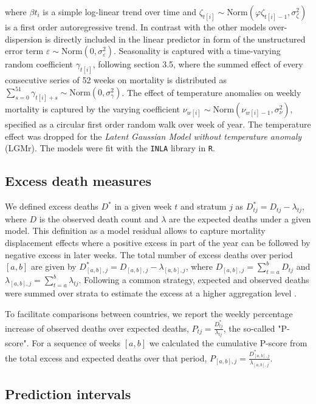 \documentclass[12pt]{article}
\begin{document}
where $\beta t_i$ is a simple log-linear trend over time and $\zeta_{t[i]} \sim \text{Norm}(\varphi \zeta_{t[i]-1}, \sigma^2_\zeta)$ is a first order autoregressive trend. In contrast with the other models over-dispersion is directly included in the linear predictor in form of the unstructured error term $\varepsilon \sim \text{Norm}(0, \sigma^2_\varepsilon)$. Seasonality is captured with a time-varying random coefficient $\gamma_{t[i]}$, following \cite{Rue2005} section 3.5, where the summed effect of every consecutive series of 52 weeks on mortality is distributed as $\sum_{s=0}^{51} \gamma_{t[i]+s} \sim \text{Norm}(0, \sigma^2_\gamma)$. The effect of temperature anomalies on weekly mortality is captured by the varying coefficient $\nu_{w[i]} \sim \text{Norm}(\nu_{w[i]-1}, \sigma^2_\nu)$, specified as a circular first order random walk over week of year. The temperature effect was dropped for the \emph{Latent Gaussian Model without temperature anomaly} (LGMr). The models were fit with the \texttt{INLA} library \cite{Rue2009, Rue2021} in \texttt{R}.

\subsection*{Excess death measures}

We defined excess deaths $D^*$ in a given week $t$ and stratum $j$ as
$D_{tj}^* = D_{tj}-\lambda_{tj}$,
where $D$ is the observed death count and $\lambda$ are the expected deaths under a given model. This definition as a model residual allows to capture mortality displacement effects where a positive excess in part of the year can be followed by negative excess in later weeks. The total number of excess deaths over period $[a,b]$ are given by
$D_{[a,b], j}^* = D_{[a,b], j} - \lambda_{[a,b], j}$,
where
$D_{[a,b], j}=\sum_{t=a}^b D_{tj}$ and
$\lambda_{[a,b], j}=\sum_{t=a}^b \lambda_{tj}$.
Following a common strategy, expected and observed deaths were summed over strata to estimate the excess at a higher aggregation level \citep{Barnard2020, Aburto2021, Kontis2020, Weinberger2020}.

To facilitate comparisons between countries, we report the weekly percentage increase of observed deaths over expected deaths,
$P_{tj}=\frac{D_{tj}^*}{\lambda_{tj}}$,
the so-called "P-score". For a sequence of weeks $[a,b]$ we calculated the cumulative P-score from the total excess and expected deaths over that period,
$P_{[a,b], j}=\frac {D_{[a,b], j}^*} {\lambda_{[a,b], j}}$.

\subsection*{Prediction intervals}
\end{document}
